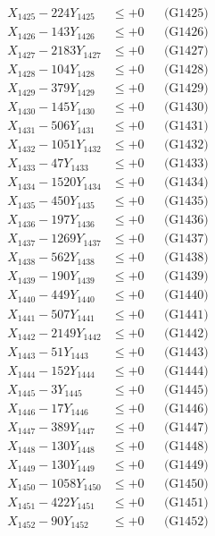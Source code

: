 \documentclass[a4paper,10pt]{article}
\begin{document}
{\begin{align}
X_{1425} - 224Y_{1425} &\leq +0 && \text{(G1425)} \\
X_{1426} - 143Y_{1426} &\leq +0 && \text{(G1426)} \\
X_{1427} - 2183Y_{1427} &\leq +0 && \text{(G1427)} \\
X_{1428} - 104Y_{1428} &\leq +0 && \text{(G1428)} \\
X_{1429} - 379Y_{1429} &\leq +0 && \text{(G1429)} \\
X_{1430} - 145Y_{1430} &\leq +0 && \text{(G1430)} \\
\allowbreak
X_{1431} - 506Y_{1431} &\leq +0 && \text{(G1431)} \\
X_{1432} - 1051Y_{1432} &\leq +0 && \text{(G1432)} \\
X_{1433} - 47Y_{1433} &\leq +0 && \text{(G1433)} \\
X_{1434} - 1520Y_{1434} &\leq +0 && \text{(G1434)} \\
X_{1435} - 450Y_{1435} &\leq +0 && \text{(G1435)} \\
X_{1436} - 197Y_{1436} &\leq +0 && \text{(G1436)} \\
X_{1437} - 1269Y_{1437} &\leq +0 && \text{(G1437)} \\
X_{1438} - 562Y_{1438} &\leq +0 && \text{(G1438)} \\
X_{1439} - 190Y_{1439} &\leq +0 && \text{(G1439)} \\
X_{1440} - 449Y_{1440} &\leq +0 && \text{(G1440)} \\
\allowbreak
X_{1441} - 507Y_{1441} &\leq +0 && \text{(G1441)} \\
X_{1442} - 2149Y_{1442} &\leq +0 && \text{(G1442)} \\
X_{1443} - 51Y_{1443} &\leq +0 && \text{(G1443)} \\
X_{1444} - 152Y_{1444} &\leq +0 && \text{(G1444)} \\
X_{1445} - 3Y_{1445} &\leq +0 && \text{(G1445)} \\
X_{1446} - 17Y_{1446} &\leq +0 && \text{(G1446)} \\
X_{1447} - 389Y_{1447} &\leq +0 && \text{(G1447)} \\
X_{1448} - 130Y_{1448} &\leq +0 && \text{(G1448)} \\
X_{1449} - 130Y_{1449} &\leq +0 && \text{(G1449)} \\
X_{1450} - 1058Y_{1450} &\leq +0 && \text{(G1450)} \\
\allowbreak
X_{1451} - 422Y_{1451} &\leq +0 && \text{(G1451)} \\
X_{1452} - 90Y_{1452} &\leq +0 && \text{(G1452)} \\

\end{align}}
\end{document}
